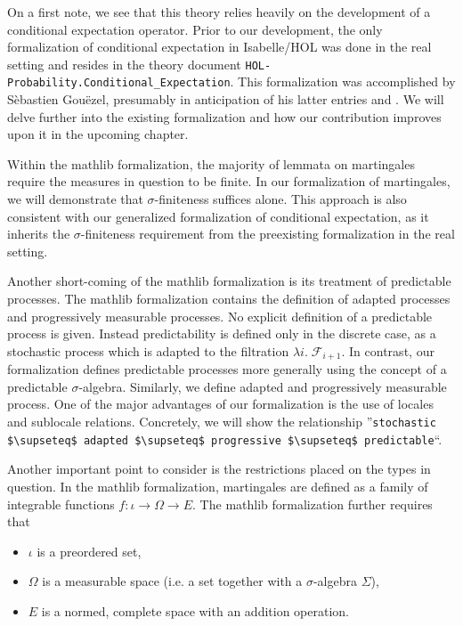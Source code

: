 On a first note, we see that this theory relies heavily on the development of a conditional expectation operator. Prior to our development, the only formalization of conditional expectation in Isabelle/HOL was done in the real setting and resides in the theory document \lstinline{HOL-Probability.Conditional_Expectation}. This formalization was accomplished by S\`ebastien Gou\"ezel, presumably in anticipation of his latter entries \cite{Ergodic_Theory-AFP} and \cite{Lp-AFP}. We will delve further into the existing formalization and how our contribution improves upon it in the upcoming chapter.

Within the \textsf{mathlib} formalization, the majority of lemmata on martingales require the measures in question to be finite. In our formalization of martingales, we will demonstrate that $\sigma$-finiteness suffices alone. This approach is also consistent with our generalized formalization of conditional expectation, as it inherits the $\sigma$-finiteness requirement from the preexisting formalization in the real setting.

Another short-coming of the \textsf{mathlib} formalization is its treatment of predictable processes. The \textsf{mathlib} formalization contains the definition of adapted processes and progressively measurable processes. No explicit definition of a predictable process is given. Instead predictability is defined only in the discrete case, as a stochastic process which is adapted to the filtration $\lambda i. \; \mathcal{F}_{i + 1}$. In contrast, our formalization defines predictable processes more generally using the concept of a predictable $\sigma$-algebra. Similarly, we define adapted and progressively measurable process. One of the major advantages of our formalization is the use of locales and sublocale relations. Concretely, we will show the relationship ''\lstinline[mathescape]{stochastic $\supseteq$ adapted $\supseteq$ progressive $\supseteq$ predictable}``.

Another important point to consider is the restrictions placed on the types in question. In the \textsf{mathlib} formalization, martingales are defined as a family of integrable functions $f : \iota \rightarrow \Omega \rightarrow E$. The \textsf{mathlib} formalization further requires that
\begin{itemize}
\item $\iota$ is a preordered set, 
\item $\Omega$ is a measurable space (i.e. a set together with a $\sigma$-algebra $\Sigma$),
\item $E$ is a normed, complete space with an addition operation.
\end{itemize}

